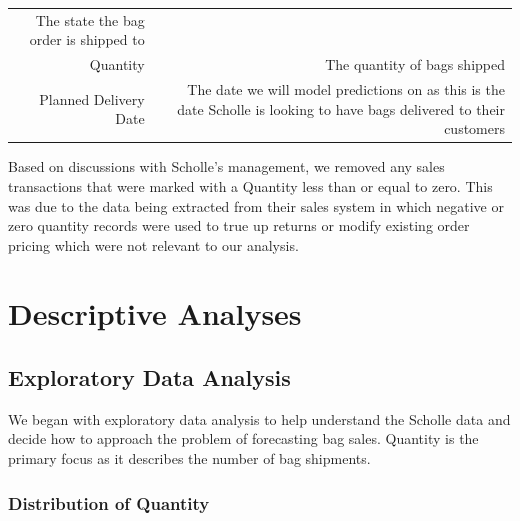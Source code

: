 \documentclass[12pt,oneside]{chicagocapstone}
\begin{document}
\begin{longtable}[]{@{}rr@{}}
\begin{minipage}[t]{0.79\columnwidth}
The state the bag order is shipped to\strut
\end{minipage}\tabularnewline
\begin{minipage}[t]{0.15\columnwidth}\raggedleft\strut
Quantity\strut
\end{minipage} & \begin{minipage}[t]{0.79\columnwidth}\raggedleft\strut
The quantity of bags shipped\strut
\end{minipage}\tabularnewline
\begin{minipage}[t]{0.15\columnwidth}\raggedleft\strut
Planned Delivery Date\strut
\end{minipage} & \begin{minipage}[t]{0.79\columnwidth}\raggedleft\strut
The date we will model predictions on as this is the date Scholle is
looking to have bags delivered to their customers\strut
\end{minipage}\tabularnewline
\bottomrule
\end{longtable}
Based on discussions with Scholle's management, we removed any sales
transactions that were marked with a Quantity less than or equal to
zero. This was due to the data being extracted from their sales system
in which negative or zero quantity records were used to true up returns
or modify existing order pricing which were not relevant to our
analysis.

\section*{Descriptive Analyses}\label{methodology-Descriptive-Analyses}

\subsection*{Exploratory Data Analysis}\label{methodology-EDA}

We began with exploratory data analysis to help understand the Scholle
data and decide how to approach the problem of forecasting bag sales.
Quantity is the primary focus as it describes the number of bag
shipments.

\subsubsection*{Distribution of
Quantity}\label{methodology-EDA-Distr-Quantity}
\end{document}
